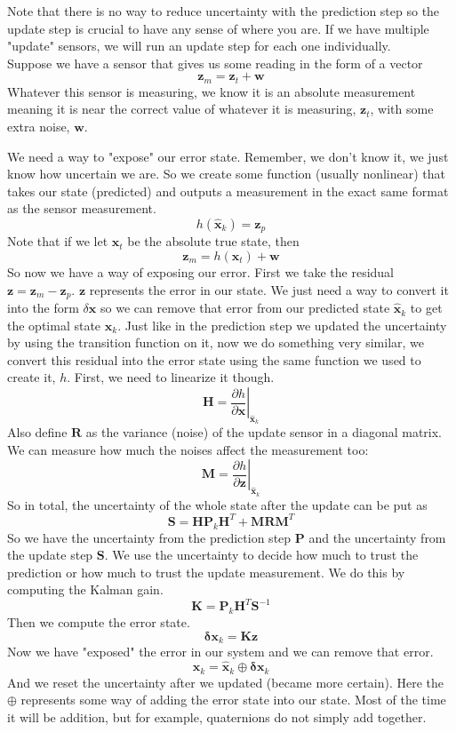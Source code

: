 \documentclass[11pt]{article}
\renewcommand{\vec}[1]{\mathbf{#1}}
\renewcommand{\tilde}[1]{\expandafter\hat{#1}}
\newcommand{\mat}[1]{\mathbf{#1}}
\begin{document}
Note that there is no way to reduce uncertainty with the prediction step so the update step is crucial to have any sense of where you are. If we have multiple "update" sensors, we will  run an update step for each one individually.\\

Suppose we have a sensor that gives us some reading in the form of a vector 
$$\vec{z}_m = \vec{z}_t + \vec{w}$$
Whatever this sensor is measuring, we know it is an absolute measurement meaning it is near the correct value of whatever it is measuring, $\vec{z}_t$, with some extra noise, $\vec{w}$.

We need a way to "expose" our error state. Remember, we don't know it, we just know how uncertain we are. So we create some function (usually nonlinear) that takes our state (predicted) and outputs a measurement in the exact same format as the sensor measurement.
$$h(\vec{\tilde{x}}_k) = \vec{z}_p$$
Note that if we let $\vec{x}_t$ be the absolute true state, then $$\vec{z}_m = h(\vec{x}_t) + \vec{w}$$
So now we have a way of exposing our error. First we take the residual $\vec{z} = \vec{z}_m - \vec{z}_p$. $\vec{z}$ represents the error in our state. We just need a way to convert it into the form $\delta \vec{x}$ so we can remove that error from our predicted state $\tilde{\vec{x}}_k$ to get the optimal state $\vec{x}_k$. Just like in the prediction step we updated the uncertainty by using the transition function on it, now we do something very similar, we convert this residual into the error state using the same function we used to create it, $h$. First, we need to linearize it though.
$$\mat{H} = \left.\frac{\partial h}{\partial \vec{x}}\right|_{\tilde{\vec{x}}_k}$$
Also define $\mat{R}$ as the variance (noise) of the update sensor in a diagonal matrix. We can measure how much the noises affect the measurement too:
$$\mat{M} = \left.\frac{\partial h}{\partial \vec{z}}\right|_{\tilde{\vec{x}}_k}$$
So in total, the uncertainty of the whole state after the update can be put as
$$ \mat{S} = \mat{H} \mat{P}_k \mat{H}^T + \mat{M} \mat{R} \mat{M}^T$$
So we have the uncertainty from the prediction step $\mat{P}$ and the uncertainty from the update step $\mat{S}$. We use the uncertainty to decide how much to trust the prediction or how much to trust the update measurement. We do this by computing the Kalman gain.\\
$$\mat{K} = \mat{P}_k \mat{H}^T \mat{S}^{-1}$$
Then we compute the error state.
$$\vec{\delta x}_k = \mat{K} \vec{z}$$
Now we have "exposed" the error in our system and we can remove that error.
$$\vec{x}_k = \vec{\tilde{x}}_k \oplus \vec{\delta x}_k$$
And we reset the uncertainty after we updated (became more certain). Here the $\oplus$ represents some way of adding the error state into our state. Most of the time it will be addition, but for example, quaternions do not simply add together.
\end{document}
